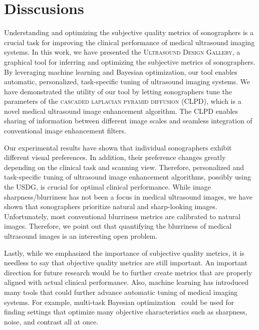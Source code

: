 

\section{Disscusions}\label{section:conclusion}
Understanding and optimizing the subjective quality metrics of sonographers is a crucial task for improving the clinical performance of medical ultrasound imaging systems.
In this work, we have presented the \textsc{Ultrasound Design Gallery}, a graphical tool for inferring and optimizing the subjective metrics of sonographers.
By leveraging machine learning and Bayesian optimization, our tool enables automatic, personalized, task-specific tuning of ultrasound imaging systems.
We have demonstrated the utility of our tool by letting sonographers tune the parameters of the \textsc{cascaded laplacian pyramid diffusion} (CLPD), which is a novel medical ultrasound image enhancement algorithm.
The CLPD enables sharing of information between different image scales and seamless integration of conventional image enhancement filters.

Our experimental results have shown that individual sonographers exhibit different visual preferences.
In addition, their preference changes greatly depending on the clinical task and scanning view.
Therefore, personalized and task-specific tuning of ultrasound image enhancement algorithms, possibly using the USDG, is crucial for optimal clinical performance.
While image sharpness/blurriness has not been a focus in medical ultrasound images, we have shown that sonographers prioritize natural and sharp-looking images.
Unfortunately, most conventional blurriness metrics are calibrated to natural images.
Therefore, we point out that quantifying the blurriness of medical ultrasound images is an interesting open problem.

Lastly, while we emphasized the importance of subjective quality metrics, it is needless to say that objective quality metrics are still important.
An important direction for future research would be to further create metrics that are properly aligned with actual clinical performance.
Also, machine learning has introduced many tools that could further advance automatic tuning of medical imaging systems.
For example, multi-task Bayesian optimization~\cite{NIPS2013_f33ba15e} could be used for finding settings that optimize many objective characteristics such as sharpness, noise, and contrast all at once.


